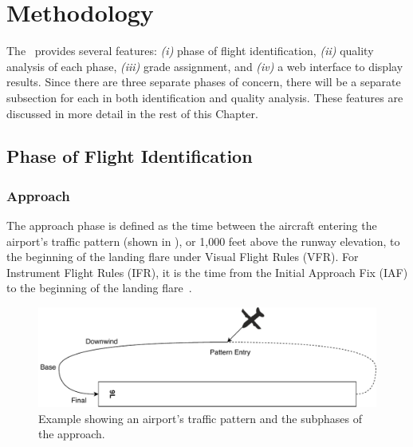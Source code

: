 
\chapter{Methodology} \label{ch:methodology}

	The \toolname\ provides several features: \textit{(i)} phase of flight identification, \textit{(ii)} quality analysis of each phase, \textit{(iii)} grade assignment, and \textit{(iv)} a web interface to display results.  Since there are three separate phases of concern, there will be a separate subsection for each in both identification and quality analysis.  These features are discussed in more detail in the rest of this Chapter.

\section{Phase of Flight Identification} \label{sec:phase_identification}

	\subsection{Approach}
    
    	The approach phase is defined as the time between the aircraft entering the airport's traffic pattern (shown in ), or 1,000 feet above the runway elevation, to the beginning of the landing flare under Visual Flight Rules (VFR).  For Instrument Flight Rules (IFR), it is the time from the Initial Approach Fix (IAF) to the beginning of the landing flare~\cite{cictt2013phase}.
        
        \begin{figure}
        	\centering
            \includegraphics[width=\linewidth]{img/airport_traffic_pattern}
            \caption{Example showing an airport's traffic pattern and the subphases of the approach.}
            \label{fig:traffic_pattern}
        \end{figure}
        
